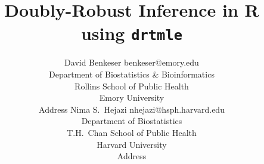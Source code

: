 \documentclass[twoside,11pt]{article}
\begin{document}
\title{Doubly-Robust Inference in R using \texttt{drtmle}}

\author{\name David Benkeser \email benkeser@emory.edu \\
       \addr Department of Biostatistics \& Bioinformatics\\
       Rollins School of Public Health\\
       Emory University\\
       Address
       \AND
       \name Nima S.~Hejazi \email nhejazi@hsph.harvard.edu \\
       \addr Department of Biostatistics\\
       T.H.~Chan School of Public Health\\
       Harvard University \\
       Address}

\maketitle
\end{document}
